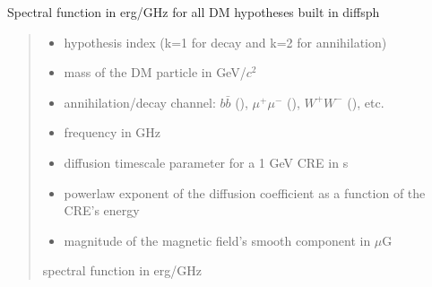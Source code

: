 \documentclass[letterpaper,10pt,english]{sphinxmanual}
\begin{document}

\begin{fulllineitems}
\label{\detokenize{diffsph.spectra:diffsph.spectra.synchrotron.X_DM}}
\pysigstartsignatures
{}
\pysigstopsignatures
\sphinxAtStartPar
Spectral function in erg/GHz for all DM hypotheses built in diffsph
\begin{quote}\begin{description}
\begin{itemize}
\item {} 
\sphinxAtStartPar
{} \textendash{} hypothesis index (k=1 for decay and k=2 for annihilation)

\item {} 
\sphinxAtStartPar
{} \textendash{} mass of the DM particle in GeV/\(c^2\)

\item {} 
\sphinxAtStartPar
{} \textendash{} annihilation/decay channel: \(b\bar b\) (), \(\mu^+ \mu^-\) (), \(W^+ W^-\) (), etc.

\item {} 
\sphinxAtStartPar
{} \textendash{} frequency in GHz

\item {} 
\sphinxAtStartPar
{} \textendash{} diffusion time\sphinxhyphen{}scale parameter for a 1 GeV CRE in s

\item {} 
\sphinxAtStartPar
{} \textendash{} power\sphinxhyphen{}law exponent of the diffusion coefficient as a function of the CRE’s energy

\item {} 
\sphinxAtStartPar
{} \textendash{} magnitude of the magnetic field’s smooth component in \(\mu\)G

\end{itemize}

\sphinxAtStartPar
spectral function in erg/GHz

\end{description}\end{quote}

\end{fulllineitems}
\end{document}
